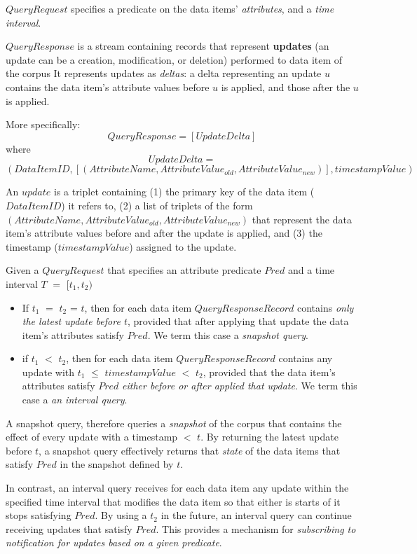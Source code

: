$QueryRequest$ specifies a predicate on the data items' \textit{attributes}, and a \textit{time interval}.

$QueryResponse$ is a stream containing records that represent \textbf{updates} (an update can be a creation, modification, or deletion)
performed to data item of the corpus
It represents updates as \textit{deltas}:
a delta representing an update $u$ contains the data item's attribute values before $u$ is applied,
and those after the $u$ is applied.

More specifically:
\[
  QueryResponse = [UpdateDelta]
\]
where
\[
  UpdateDelta =
\]
\[
  (DataItemID, [(AttributeName, AttributeValue_{old}, AttributeValue_{new})], timestampValue)
\]

An $update$ is a triplet containing
(1) the primary key of the data item ($DataItemID$) it refers to,
(2) a list of triplets of the form $(AttributeName, AttributeValue_{old}, AttributeValue_{new})$ that represent the
data item's attribute values before and after the update is applied,
and (3) the timestamp ($timestampValue$) assigned to the update.

Given a $QueryRequest$ that specifies an attribute predicate $Pred$ and a time interval $T$ $=$ $[t_1, t_2)$
\begin{itemize}

  \item If $t_1$ $=$ $t_2$ = $t$,
  then for each data item $QueryResponseRecord$ contains \textit{only the latest update before $t$},
  provided that after applying that update the data item's attributes satisfy $Pred$.
  We term this case a \textit{snapshot query}.

  \item if $t_1$ $<$ $t_2$,
  then for each data item $QueryResponseRecord$ contains any update with $t_1$ $\leq$ $timestampValue$ $<$ $t_2$,
  provided that the data item's attributes satisfy $Pred$ \textit{either before or after applied that update}.
  We term this case a \textit{an interval query}.

\end{itemize}

A snapshot query, therefore queries a \textit{snapshot} of the corpus that contains the effect of every update with a
timestamp $<$ $t$.
By returning the latest update before $t$, a snapshot query effectively returns that \textit{state} of the data items
that satisfy $Pred$ in the snapshot defined by $t$.

In contrast, an interval query receives for each data item any update within the specified time interval that modifies
the data item so that either is starts of it stops satisfying $Pred$.
By using a $t_2$ in the future, an interval query can continue receiving updates that satisfy $Pred$.
This provides a mechanism for \textit{subscribing to notification for updates based on a given predicate}.


